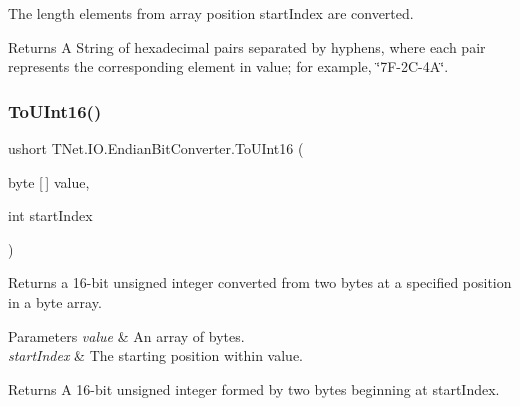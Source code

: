 The length elements from array position start\+Index are converted.

\begin{DoxyReturn}{Returns}
A String of hexadecimal pairs separated by hyphens, where each pair represents the corresponding element in value; for example, \char`\"{}7\+F-\/2\+C-\/4\+A\char`\"{}. 
\end{DoxyReturn}
\mbox{\label{class_t_net_1_1_i_o_1_1_endian_bit_converter_a164e8478c154756a2a902efd889d8c84}} 
\subsubsection{\texorpdfstring{To\+U\+Int16()}{ToUInt16()}}
{\footnotesize\ttfamily ushort T\+Net.\+I\+O.\+Endian\+Bit\+Converter.\+To\+U\+Int16 (\begin{DoxyParamCaption}\item[{byte \mbox{[}$\,$\mbox{]}}]{value,  }\item[{int}]{start\+Index }\end{DoxyParamCaption})}



Returns a 16-\/bit unsigned integer converted from two bytes at a specified position in a byte array. 


\begin{DoxyParams}{Parameters}
{\em value} & An array of bytes.\\
\hline
{\em start\+Index} & The starting position within value.\\
\hline
\end{DoxyParams}
\begin{DoxyReturn}{Returns}
A 16-\/bit unsigned integer formed by two bytes beginning at start\+Index.
\end{DoxyReturn}
\mbox{\label{class_t_net_1_1_i_o_1_1_endian_bit_converter_a663d4f8714c5a58433ecef1f7db68b99}} 
